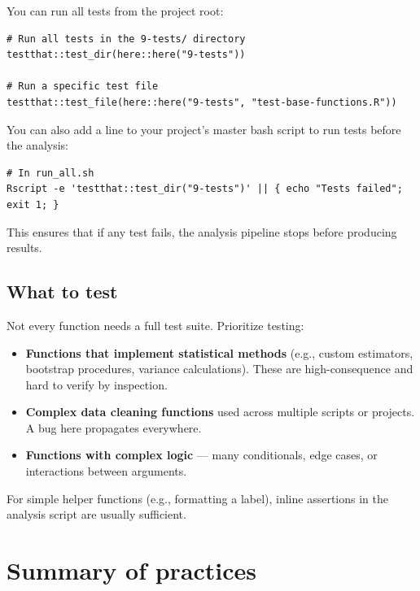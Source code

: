 \documentclass[
]{book}
\providecommand{\tightlist}{%
  \setlength{\itemsep}{0pt}\setlength{\parskip}{0pt}}
\begin{document}
You can run all tests from the project root:

\begin{verbatim}
# Run all tests in the 9-tests/ directory
testthat::test_dir(here::here("9-tests"))

# Run a specific test file
testthat::test_file(here::here("9-tests", "test-base-functions.R"))
\end{verbatim}

You can also add a line to your project's master bash script to run tests before the analysis:

\begin{verbatim}
# In run_all.sh
Rscript -e 'testthat::test_dir("9-tests")' || { echo "Tests failed"; exit 1; }
\end{verbatim}

This ensures that if any test fails, the analysis pipeline stops before producing results.

\subsection{What to test}\label{what-to-test}

Not every function needs a full test suite. Prioritize testing:

\begin{itemize}
\tightlist
\item
  \textbf{Functions that implement statistical methods} (e.g., custom estimators, bootstrap procedures, variance calculations). These are high-consequence and hard to verify by inspection.
\item
  \textbf{Complex data cleaning functions} used across multiple scripts or projects. A bug here propagates everywhere.
\item
  \textbf{Functions with complex logic} --- many conditionals, edge cases, or interactions between arguments.
\end{itemize}

For simple helper functions (e.g., formatting a label), inline assertions in the analysis script are usually sufficient.

\section{Summary of practices}\label{summary-of-practices}
\end{document}
